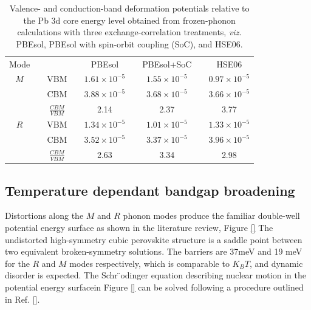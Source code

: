 \begin{table}[]
\caption[Valence- and conduction-band deformation potentials at three levels of theory]{
Valence- and conduction-band deformation potentials relative to the Pb 3d core energy level obtained from frozen-phonon calculations with three exchange-correlation treatments, \textit{viz.} PBEsol, PBEsol with spin-orbit coupling (SoC), and HSE06.
}
\begin{tabular}{ccccccccc} \label{ch5allxc}
Mode & \hspace{5pt} & & \hspace{5pt} & PBEsol & \hspace{5pt} & PBEsol+SoC & \hspace{5pt} & HSE06 \\
$M$ & & VBM & & $1.61 \times 10^{-5}$ & & $1.55 \times 10^{-5}$ & & $0.97 \times 10^{-5}$ \\
& & CBM & & $3.88 \times 10^{-5}$ & & $3.68 \times 10^{-5}$ & & $3.66 \times 10^{-5}$ \\ 
& & $\frac{CBM}{VBM}$ & & 2.14 &  & 2.37 & & 3.77  \vspace{5pt} \\

$R$ & & VBM & & $1.34 \times 10^{-5}$ & & $1.01 \times 10^{-5}$ & & $1.33 \times 10^{-5}$ \\
& & CBM & & $3.52 \times 10^{-5}$ & & $3.37 \times 10^{-5}$ & & $3.96 \times 10^{-5}$ \\
& & $\frac{CBM}{VBM}$ & & 2.63 & & 3.34 & & 2.98 \vspace{5pt} \\ 
\end{tabular}
\end{table}


\subsection{Temperature dependant bandgap broadening} \label{ch5coupling}

Distortions along the $M$ and $R$ phonon modes produce the familiar double-well potential energy surface as shown in the literature review, Figure \ref{}
The undistorted high-symmetry cubic perovskite structure is a saddle point between two equivalent broken-symmetry solutions. The barriers are 37meV and 19 meV for the $R$ and $M$ modes respectively, which is comparable to $K_BT$, and dynamic disorder is expected.
The Schr ̈odinger equation describing nuclear motion in the potential energy surfacein  Figure \ref{} can be solved following a procedure outlined in Ref. [].\cite{}%

